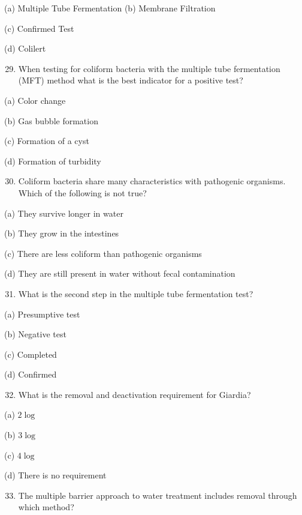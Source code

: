 \documentclass[10pt]{article}
\begin{document}
(a) Multiple Tube Fermentation (b) Membrane Filtration

(c) Confirmed Test

(d) Colilert

\begin{enumerate}
  \setcounter{enumi}{28}
  \item When testing for coliform bacteria with the multiple tube fermentation (MFT) method what is the best indicator for a positive test?
\end{enumerate}

(a) Color change

(b) Gas bubble formation

(c) Formation of a cyst

(d) Formation of turbidity

\begin{enumerate}
  \setcounter{enumi}{29}
  \item Coliform bacteria share many characteristics with pathogenic organisms. Which of the following is not true?
\end{enumerate}

(a) They survive longer in water

(b) They grow in the intestines

(c) There are less coliform than pathogenic organisms

(d) They are still present in water without fecal contamination

\begin{enumerate}
  \setcounter{enumi}{30}
  \item What is the second step in the multiple tube fermentation test?
\end{enumerate}

(a) Presumptive test

(b) Negative test

(c) Completed

(d) Confirmed

\begin{enumerate}
  \setcounter{enumi}{31}
  \item What is the removal and deactivation requirement for Giardia?
\end{enumerate}

(a) $2 \log$

(b) $3 \log$

(c) $4 \log$

(d) There is no requirement

\begin{enumerate}
  \setcounter{enumi}{32}
  \item The multiple barrier approach to water treatment includes removal through which method?
\end{enumerate}
\end{document}
